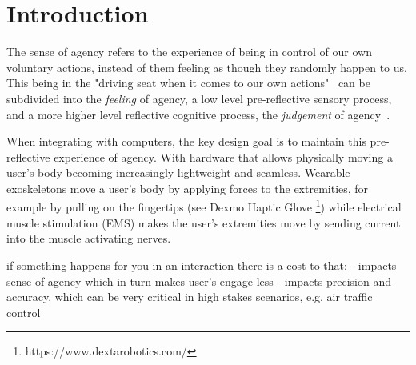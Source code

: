 \section{Introduction}


The sense of agency refers to the experience of being in control of our own voluntary actions, instead of them feeling as though they randomly happen to us. This being in the "driving seat when it comes to our own actions"~\cite{Moore2016-ubd} can be subdivided into the \textit{feeling} of agency, a low level pre-reflective sensory process, and a more higher level reflective cognitive process, the \textit{judgement} of agency~\cite{Moore2016-ub, Danry2022-xk}.

When integrating with computers, the key design goal is to maintain this pre-reflective experience of agency. With hardware that allows physically moving a user's body becoming increasingly lightweight and seamless. Wearable exoskeletons move a user's body by applying forces to the extremities, for example by pulling on the fingertips (see Dexmo Haptic Glove \footnote{https://www.dextarobotics.com/}) while electrical muscle stimulation (EMS) makes the user's extremities move by sending current into the muscle activating nerves.


if something happens for you in an interaction there is a cost to that:
- impacts sense of agency which in turn makes user's engage less
- impacts precision and accuracy, which can be very critical in high stakes scenarios, e.g. air traffic control


